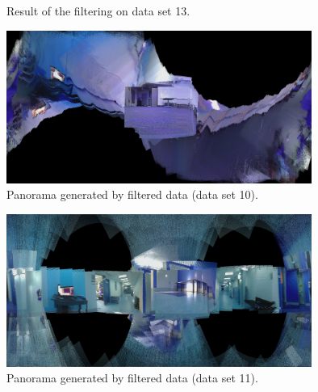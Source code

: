 \documentclass[letterpaper, 10 pt, conference]{ieeeconf}  %
\begin{document}
   \begin{figure}[thpb]
      \centering
      
      \caption{Result of the filtering on data set 13.}
      \label{test13}
   \end{figure}
   
\begin{figure} [ht]
  \includegraphics[width=\textwidth,height=5cm]{panorama10}
  \caption{Panorama generated by filtered data (data set 10).}
  \label{pano10}
\end{figure}

\begin{figure} [ht]
  \includegraphics[width=\textwidth,height=5cm]{panorama11}
  \caption{Panorama generated by filtered data (data set 11).}
  \label{pano11}
\end{figure} 
\end{document}
